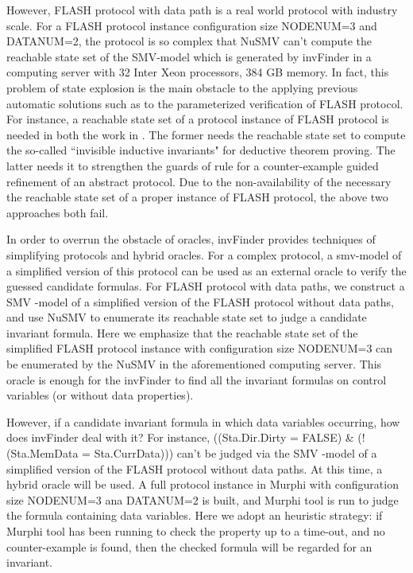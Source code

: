 \documentclass{llncs}
\newcommand{\bedt}[1]{{\color{black}#1}}
\begin{document}
However, FLASH protocol with data path is a real world protocol with industry scale. For a FLASH protocol   instance configuration size NODENUM=3 and DATANUM=2, the protocol is so complex that NuSMV can't compute the reachable state set of the SMV-model which is generated by {\sf invFinder} in a computing server  with 32 Inter Xeon processors, 384 GB memory. In fact, this problem of  state explosion is the main obstacle to the applying previous automatic solutions such as \cite{Arons2001,Lv2007} to the parameterized verification of FLASH protocol. For instance, a reachable state set of a protocol instance of FLASH protocol is needed in both the work in \cite{Arons2001,Lv2007}. The former needs the reachable state set to compute the so-called ``invisible inductive invariants" for deductive theorem proving. The latter needs it to strengthen
 the guards of rule for a counter-example guided refinement of an abstract protocol. Due to the non-availability of the necessary the reachable state set of a proper instance of FLASH protocol, the above two approaches both fail.

 In order to overrun the obstacle of oracles, {\sf invFinder} provides techniques of simplifying protocols and hybrid oracles. For a complex protocol, a smv-model of a  simplified version of this protocol can be used as an external oracle to verify the guessed candidate formulas. For FLASH protocol with data paths,  we construct a SMV -model of a simplified version of the FLASH protocol without data paths, and use NuSMV to enumerate its reachable state set to judge a candidate invariant formula. Here we  emphasize that the reachable state set of the simplified FLASH protocol  instance  with configuration size NODENUM=3 can be enumerated by the NuSMV in the aforementioned computing server. This oracle is enough for the {\sf invFinder} to find all the invariant formulas on control variables (or without data properties).

 However, if a candidate invariant formula in which data variables occurring, how does {\sf invFinder} deal with it?  For instance, ((Sta.Dir.Dirty = FALSE) \& (!(Sta.MemData = Sta.CurrData))) can't be judged via the SMV -model of a simplified version of the FLASH protocol without data paths. At this time, a hybrid oracle will be used.  A full protocol instance in Murphi  with configuration size NODENUM=3 ana DATANUM=2 \bedt{is built}, and  Murphi \bedt{tool} is run to judge the formula containing data variables. Here we adopt an \bedt{heuristic} strategy: \bedt{if Murphi tool has been running to check the property up to a time-out,} and no counter-example is found, then the checked formula will be regarded for an invariant.
\end{document}
